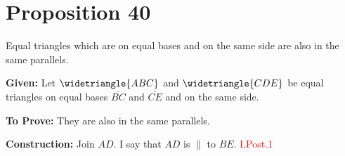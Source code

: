 
\section*{Proposition 40}

\begin{thm}
Equal triangles which are on equal bases and on the same side are also in the same parallels.
\end{thm}

\textbf{Given:} Let $\widetriangle{ABC}$ and $\widetriangle{CDE}$ be equal triangles on equal bases $\overline{BC}$ and $\overline{CE}$ and on the same side.

\begin{figure}[H]
	\caption{}
\end{figure}

\textbf{To Prove:} They are also in the same parallels.

\textbf{Construction:} Join $AD$. I say that $AD$ is $\parallel$ to $BE$. \hfill\textcolor{red}{I.Post.1}

\begin{figure}[H]
	\caption{}
\end{figure}

